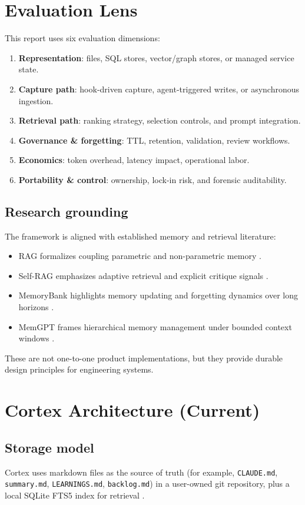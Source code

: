 \documentclass[11pt]{article}
\begin{document}
\section{Evaluation Lens}
This report uses six evaluation dimensions:
\begin{enumerate}
  \item \textbf{Representation}: files, SQL stores, vector/graph stores, or managed service state.
  \item \textbf{Capture path}: hook-driven capture, agent-triggered writes, or asynchronous ingestion.
  \item \textbf{Retrieval path}: ranking strategy, selection controls, and prompt integration.
  \item \textbf{Governance \& forgetting}: TTL, retention, validation, review workflows.
  \item \textbf{Economics}: token overhead, latency impact, operational labor.
  \item \textbf{Portability \& control}: ownership, lock-in risk, and forensic auditability.
\end{enumerate}

\subsection{Research grounding}
The framework is aligned with established memory and retrieval literature:
\begin{itemize}
  \item RAG formalizes coupling parametric and non-parametric memory \cite{rag2020}.
  \item Self-RAG emphasizes adaptive retrieval and explicit critique signals \cite{selfrag2023}.
  \item MemoryBank highlights memory updating and forgetting dynamics over long horizons \cite{memorybank2023}.
  \item MemGPT frames hierarchical memory management under bounded context windows \cite{memgpt2023}.
\end{itemize}

These are not one-to-one product implementations, but they provide durable design principles for engineering systems.

\section{Cortex Architecture (Current)}
\subsection{Storage model}
Cortex uses markdown files as the source of truth (for example, \texttt{CLAUDE.md}, \texttt{summary.md}, \texttt{LEARNINGS.md}, \texttt{backlog.md}) in a user-owned git repository, plus a local SQLite FTS5 index for retrieval \cite{cortex-readme,cortex-shared,cortex-cli}.
\end{document}
